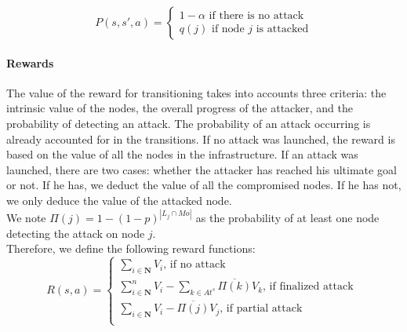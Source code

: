     
\begin{equation}
    P(s,s',a) = \begin{cases}
        1-\alpha \text{ if there is no attack}\\
        q(j)\text{ if node $j$ is attacked}
    \end{cases}
\end{equation}
\paragraph{Rewards}

The value of the reward for transitioning takes into accounts three criteria: the intrinsic value of the nodes, the overall progress of the attacker, and the probability of detecting an attack. The probability of an attack occurring is already accounted for in the transitions.
If no attack was launched, the reward is based on the value of all the nodes in the infrastructure. 
If an attack was launched, there are two cases: whether the attacker has reached his ultimate goal or not.
If he has, we deduct the value of all the compromised nodes. If he has not, we only deduce the value of the attacked node.
\\We note $\Pi(j)=1 - (1-p)^{|L_j \cap Mo|}$ as the probability of at least one node detecting the attack on node $j$.
\\
Therefore, we define the following reward functions: %
\\
\begin{equation}
  R(s,a) =\begin{cases}
    \sum\limits_{i\in \textbf{N}} V_i \text{, if no attack}\\
    \sum\limits_{i\in \textbf{N}}^n V_i - \sum\limits_{k \in At^s} \overline{\Pi(k)}V_k \text{, if finalized attack }\\
    \sum\limits_{i\in \textbf{N}} V_i - \overline{\Pi(j)}V_j \text{, if partial attack}\\
  \end{cases}
\end{equation}





